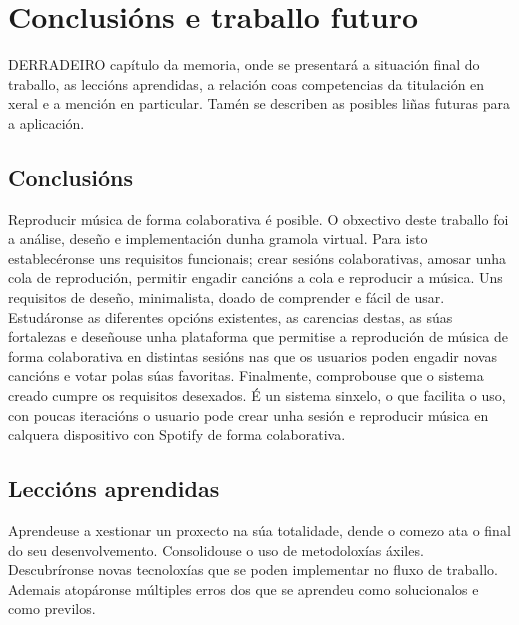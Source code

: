 \chapter{Conclusións e traballo futuro}
\label{chap:conclusions}

\lettrine{D}{ERRADEIRO} capítulo da memoria, onde se presentará a situación final do traballo, as leccións aprendidas, a relación coas competencias da titulación en xeral e a mención en particular. Tamén se describen as posibles liñas futuras para a aplicación.

\section*{Conclusións}
Reproducir música de forma colaborativa é posible. O obxectivo deste traballo foi a análise, deseño e implementación dunha gramola virtual. Para isto establecéronse uns requisitos funcionais; crear sesións colaborativas, amosar unha cola de reprodución, permitir engadir cancións a cola e reproducir a música. Uns requisitos de deseño, minimalista, doado de comprender e fácil de usar. Estudáronse as diferentes opcións existentes, as carencias destas, as súas fortalezas e deseñouse unha plataforma que permitise a reprodución de música de forma colaborativa en distintas sesións nas que os usuarios poden engadir novas cancións e votar polas súas favoritas.\smallbreak
Finalmente, comprobouse que o sistema creado cumpre os requisitos desexados. É un sistema sinxelo, o que facilita o uso, con poucas iteracións o usuario pode crear unha sesión e reproducir música en calquera dispositivo con Spotify de forma colaborativa.

\section*{Leccións aprendidas}
Aprendeuse a xestionar un proxecto na súa totalidade, dende o comezo ata o final do seu desenvolvemento. Consolidouse o uso de metodoloxías áxiles. Descubríronse novas tecnoloxías que se poden implementar no fluxo de traballo. Ademais atopáronse múltiples erros dos que se aprendeu como solucionalos e como previlos.

